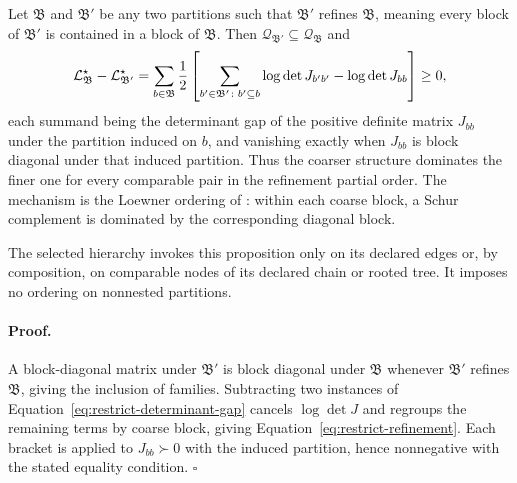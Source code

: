 Let \(\mathfrak B\) and \(\mathfrak B'\) be any two partitions such that
\(\mathfrak B'\) refines \(\mathfrak B\), meaning every block of
\(\mathfrak B'\) is contained in a block of \(\mathfrak B\). Then
\(\mathcal Q_{\mathfrak B'}\subseteq\mathcal Q_{\mathfrak B}\) and
\begin{equation}
\mathcal L^\star_{\mathfrak B}-\mathcal L^\star_{\mathfrak B'}
=\sum_{b\in\mathfrak B}\frac12\left[
\sum_{b'\in\mathfrak B'\colon b'\subseteq b}\log\det J_{b'b'}
-\log\det J_{bb}\right]
\geq0,
\label{eq:restrict-refinement}
\end{equation}
each summand being the determinant gap of the positive definite matrix $J_{bb}$ under the partition induced on $b$, and vanishing exactly when $J_{bb}$ is block diagonal under that induced partition. Thus the coarser structure dominates the finer one for every comparable pair in the refinement partial order. The mechanism is the Loewner ordering of : within each coarse block, a Schur complement is dominated by the corresponding diagonal block. 

The selected hierarchy invokes this proposition only on its declared edges or,
by composition, on comparable nodes of its declared chain or rooted tree. It
imposes no ordering on nonnested partitions. 

\paragraph{Proof.}
A block-diagonal matrix under $\mathfrak B'$ is block diagonal under $\mathfrak B$ whenever $\mathfrak B'$ refines $\mathfrak B$, giving the inclusion of families. Subtracting two instances of Equation~\eqref{eq:restrict-determinant-gap} cancels $\log\det J$ and regroups the remaining terms by coarse block, giving Equation~\eqref{eq:restrict-refinement}. Each bracket is  applied to $J_{bb}\succ0$ with the induced partition, hence nonnegative with the stated equality condition. $\square$

